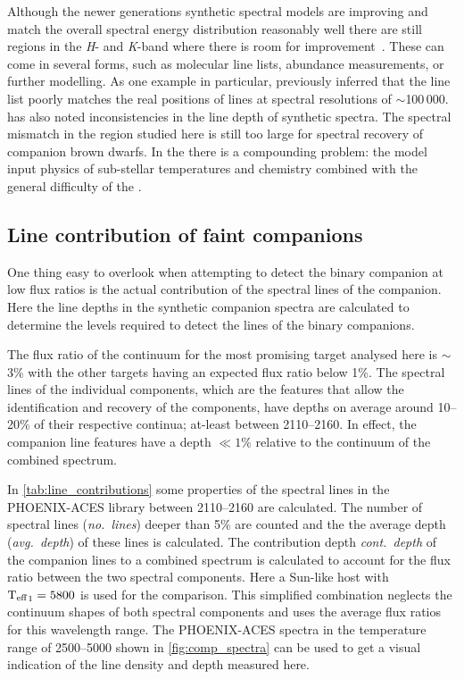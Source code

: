 
Although the newer generations synthetic spectral models are improving and match the overall spectral energy distribution reasonably well there are still regions in the \emph{H}- and \emph{K}-band where there is room for improvement~\citet{rajpurohit_spectral_2016}.
These can come in several forms, such as molecular line lists, abundance measurements, or further modelling.
As one example in particular, \citet{rajpurohit_spectral_2016} previously inferred that the  line list poorly matches the real positions of  lines at spectral resolutions of \(\sim\)100\,000.
\citet{passegger_carmenes_2018} has also noted inconsistencies in the line depth of synthetic spectra.
The spectral mismatch in the region studied here is still too large for spectral recovery of companion brown dwarfs.
In the \nir{} there is a compounding problem: the model input physics of sub-stellar temperatures and chemistry combined with the general difficulty of the \nir{}.

\subsection{Line contribution of faint companions}
\label{subsec:line_contributions}
One thing easy to overlook when attempting to detect the binary companion at low flux ratios is the actual contribution of the spectral lines of the companion.
Here the line depths in the synthetic companion spectra are calculated to determine the \snr{} levels required to detect the lines of the binary companions.

The flux ratio of the continuum for the most promising target analysed here is \FtwoFone{}\(\sim\)3\% with the other targets having an expected flux ratio below 1\%.
The spectral lines of the individual components, which are the features that allow the identification and recovery of the components, have depths on average around 10--20\% of their respective continua; at-least between 2110--2160\nm{}.
In effect, the companion line features have a depth \(\ll 1\%\) relative to the continuum of the combined spectrum.

In \cref{tab:line_contributions} some properties of the spectral lines in the {PHOENIX-ACES} library between 2110--2160\nm{} are calculated.
The number of spectral lines (\emph{no.~lines}) deeper than 5\% are counted and the the average depth (\emph{avg.~depth}) of these lines is calculated.
The contribution depth \emph{cont.~depth} of the companion lines to a combined spectrum is calculated to account for the flux ratio between the two spectral components.
Here a Sun-like host with \({\textrm{T}_{\mathrm{eff}}}_{1}=5800\)\K{} is used for the comparison.
This simplified combination neglects the continuum shapes of both spectral components and uses the average flux ratios for this wavelength range.
The {PHOENIX-ACES} spectra in the temperature range of 2500--5000\K{} shown in \cref{fig:comp_spectra} can be used to get a visual indication of the line density and depth measured here.

